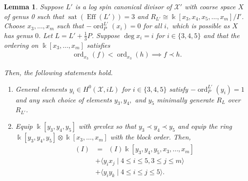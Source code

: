 \documentclass{amsart}
\theoremstyle{plain}
\newtheorem{lem}[thm]{Lemma}
\theoremstyle{definition}
\theoremstyle{remark}
\numberwithin{equation}{section}
\newcommand\Bk{{\Bbbk}}
\DeclareMathOperator{\ord}{ord}
\newcommand\sx{\mathscr X}
\newcommand{\halfcan}{L}
\DeclareMathOperator{\initial}{in_\prec}
\DeclareMathOperator{\Eff}{Eff}
\DeclareMathOperator{\sat}{sat}
\begin{document}
\begin{lem}
\label{lem:sat-3}
Suppose $\halfcan'$ is a log spin canonical divisor of $\sx'$ with coarse
space $X$ of genus 0 such that $\sat(\Eff(\halfcan')) = 3$ and $R_
{\halfcan'} \cong \Bk[x_3, x_4 , x_5, \ldots, x_m]/I'$. Choose $x_3, \ldots, x_m$ such that $-\ord^{L'}_P(x_i)=0$ for all $i,$ which is possible as $X$ has genus $0$. Let $L = L' + \frac
{1}{3}P$. Suppose $\deg x_i = i$ for $i \in \{3, 4, 5\}$ and that
the ordering on $\Bk[x_3, \ldots, x_m]$ satisfies
\begin{align*}
	\ord_{x_3}(f) < \ord_{x_3}(h) \implies f \prec h.
\end{align*}

\noindent
Then, the following statements hold.

\begin{enumerate}
	\item[(a)] General elements  $y_i \in H^0(\sx, iL)$ for $i \in \{3,
		4,5\}$ satisfy $-\ord_P^{\halfcan'}(y_i) = 1$ and any such choice of elements $y
		_3, y_4,$ and $y_5$ minimally generate $R_\halfcan$ over $R_{\halfcan'}$.
	\item[(b)] Equip $\Bk[y_3, y_4, y_5]$ with grevlex so that $y_3 \prec 
		y_4 \prec y_5$
		and equip the ring $\Bk[y_3, y_4, y_5] \otimes \Bk[x_3, \ldots, x_m]$ with the block order.  Then,
		\begin{align*}
			\initial(I) &= \initial(I) \Bk[y_3, y_4, y_5, x_3, \ldots, x_m] \\
			&+ \langle y_i x_j \mid 4 \leq i \leq 5, 3 \leq j \leq m\rangle \\
			&+ \langle y_i y_k \mid 4 \leq i \leq j \leq 5\rangle.
		\end{align*}
\end{enumerate}
\end{lem}
\end{document}
